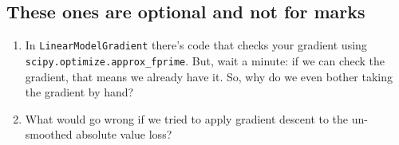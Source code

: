 \documentclass{article}
\def\enum#1{\begin{enumerate}#1\end{enumerate}}
\begin{document}
\subsection{These ones are optional and not for marks}

\enum{
\item In \texttt{LinearModelGradient} there's code that checks your gradient using \texttt{scipy.optimize.approx\_fprime}. But, wait a minute: if we can check the gradient, that means we already have it. So, why do we even bother taking the gradient by hand? 
\item What would go wrong if we tried to apply gradient descent to the un-smoothed absolute value loss?
}
\end{document}
